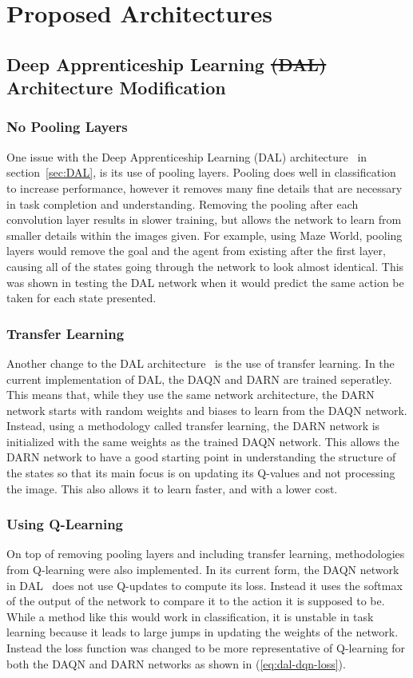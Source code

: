 \documentclass[12pt,american]{report}
\providecommand{\DIFdeltex}[1]{{\protect\color{red}\sout{#1}}}                      %
\providecommand{\DIFdelbegin}{} %
\providecommand{\DIFdelend}{} %
\providecommand{\DIFdel}[1]{\texorpdfstring{\DIFdeltex{#1}}{}} %
\newcommand{\DIFscaledelfig}{0.5}
\newlength{\DIFdelgraphicswidth} %
\newlength{\DIFdelgraphicsheight} %
\newcommand{\DIFdelincludegraphics}[2][]{%
\sbox{\DIFdelgraphicsbox}{\DIFOincludegraphics[#1]{#2}}%
\settoboxwidth{\DIFdelgraphicswidth}{\DIFdelgraphicsbox} %
\settoboxtotalheight{\DIFdelgraphicsheight}{\DIFdelgraphicsbox} %
\scalebox{\DIFscaledelfig}{%
\parbox[b]{\DIFdelgraphicswidth}{\usebox{\DIFdelgraphicsbox}\\[-\baselineskip] \rule{\DIFdelgraphicswidth}{0em}}\llap{\resizebox{\DIFdelgraphicswidth}{\DIFdelgraphicsheight}{%
\setlength{\unitlength}{\DIFdelgraphicswidth}%
\begin{picture}(1,1)%
\thicklines\linethickness{2pt} %
{\color[rgb]{1,0,0}\put(0,0){\framebox(1,1){}}}%
{\color[rgb]{1,0,0}\put(0,0){\line( 1,1){1}}}%
{\color[rgb]{1,0,0}\put(0,1){\line(1,-1){1}}}%
\end{picture}%
}\hspace*{3pt}}} %
} %
\DeclareRobustCommand{\DIFdelbegin}{\DIFOdelbegin \let\includegraphics\DIFdelincludegraphics} %
\DeclareRobustCommand{\DIFdelend}{\DIFOaddend \let\includegraphics\DIFOincludegraphics} %
\begin{document}
\chapter{Proposed Architectures}
\label{sec:proposed_architectures}
\section{Deep Apprenticeship Learning \DIFdelbegin \DIFdel{(DAL) }\DIFdelend Architecture \DIFdelbegin %
\DIFdelend Modification}
\subsection{No Pooling Layers}
One issue with the Deep Apprenticeship Learning (DAL) architecture~\cite{markovikj2014deep} in section~\ref{sec:DAL}, is its use of pooling layers.  Pooling does well in classification to increase performance, however it removes many fine details that are necessary in task completion and understanding.  Removing the pooling after each convolution layer results in slower training, but allows the network to learn from smaller details within the images given.  For example, using Maze World, pooling layers would remove the goal and the agent from existing after the first layer, causing all of the states going through the network to look almost identical.  This was shown in testing the DAL network when it would predict the same action be taken for each state presented.
\subsection{Transfer Learning}
Another change to the DAL architecture~\cite{markovikj2014deep} is the use of transfer learning.  In the current implementation of DAL, the DAQN and DARN are trained seperatley.  This means that, while they use the same network architecture, the DARN network starts with random weights and biases to learn from the DAQN network.  Instead, using a methodology called transfer learning, the DARN network is initialized with the same weights as the trained DAQN network.  This allows the DARN network to have a good starting point in understanding the structure of the states so that its main focus is on updating its Q-values and not processing the image.  This also allows it to learn faster, and with a lower cost.
\subsection{Using Q-Learning}
On top of removing pooling layers and including transfer learning, methodologies from Q-learning were also implemented.  In its current form, the DAQN network in DAL~\cite{markovikj2014deep} does not use Q-updates to compute its loss.  Instead it uses the softmax of the output of the network to compare it to the action it is supposed to be.  While a method like this would work in classification, it is unstable in task learning because it leads to large jumps in updating the weights of the network.  Instead the loss function was changed to be more representative of Q-learning for both the DAQN and DARN networks as shown in (\ref{eq:dal-dqn-loss}).
\end{document}
